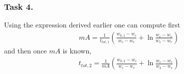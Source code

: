 \documentclass[letterpaper,10pt,english]{jupyterBook}
\begin{document}
\subsubsection{Task 4.}
\label{\detokenize{Exercise_W10_2021:task-4}}
\sphinxAtStartPar
Using the expression derived earlier one can compute first
\begin{equation*}
\begin{split}
mA=\frac{1}{t_{tot,1}}\left(\frac{w_{0,1}-w_c}{w_c-w_e}+\ln\frac{w_c-w_e}{w_1-w_e}\right)
\end{split}
\end{equation*}
\sphinxAtStartPar
and then once \(mA\) is known,
\begin{equation*}
\begin{split}
t_{tot,2}=\frac{1}{mA}\left(\frac{w_{0,2}-w_c}{w_c-w_e}+\ln\frac{w_c-w_e}{w_2-w_e}\right)
\end{split}
\end{equation*}
\end{document}
